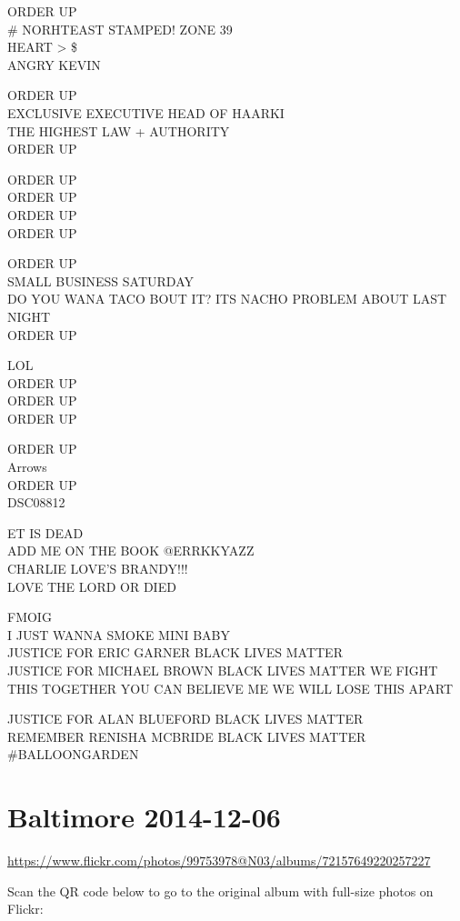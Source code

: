 \documentclass[10pt,letterpaper]{article}
\begin{document}
ORDER UP\\
\# NORHTEAST STAMPED! ZONE 39\\
HEART > \$\\
ANGRY KEVIN

ORDER UP\\
EXCLUSIVE EXECUTIVE HEAD OF HAARKI\\
THE HIGHEST LAW + AUTHORITY\\
ORDER UP

ORDER UP\\
ORDER UP\\
ORDER UP\\
ORDER UP

ORDER UP\\
SMALL BUSINESS SATURDAY\\
DO YOU WANA TACO BOUT IT?  ITS NACHO PROBLEM ABOUT LAST NIGHT\\
ORDER UP

LOL\\
ORDER UP\\
ORDER UP\\
ORDER UP

ORDER UP\\
Arrows\\
ORDER UP\\
DSC08812

ET IS DEAD\\
ADD ME ON THE BOOK @ERRKKYAZZ\\
CHARLIE LOVE'S BRANDY!!!\\
LOVE THE LORD OR DIED

FMOIG\\
I JUST WANNA SMOKE MINI BABY\\
JUSTICE FOR ERIC GARNER BLACK LIVES MATTER\\
JUSTICE FOR MICHAEL BROWN BLACK LIVES MATTER WE FIGHT THIS TOGETHER YOU CAN BELIEVE ME WE WILL LOSE THIS APART

JUSTICE FOR ALAN BLUEFORD BLACK LIVES MATTER\\
REMEMBER RENISHA MCBRIDE BLACK LIVES MATTER\\
\#BALLOONGARDEN


\section*{Baltimore 2014-12-06}

\url{https://www.flickr.com/photos/99753978@N03/albums/72157649220257227}

Scan the QR code below to go to the original album with full-size photos on Flickr:
\end{document}
